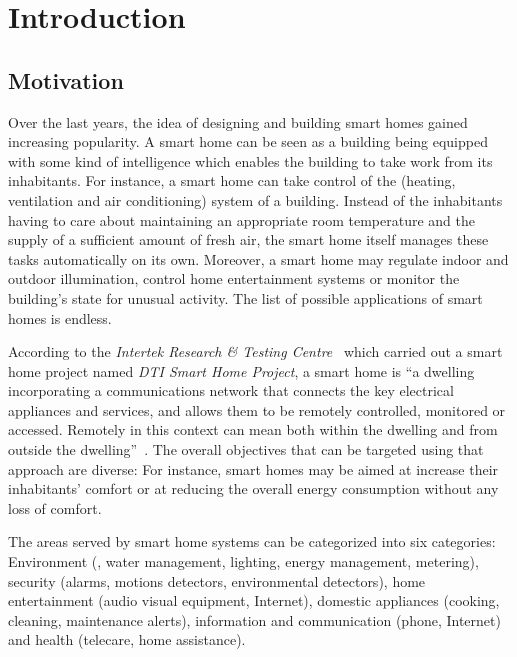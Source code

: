 \chapter{Introduction}
\label{ch:intro}

\section{Motivation}
\label{sec:motivation}

Over the last years, the idea of designing and building smart homes gained increasing popularity. A smart home can be seen as a building being equipped with some kind of intelligence which enables the building to take work from its inhabitants. For instance, a smart home can take control of the  (heating, ventilation and air conditioning) system of a building. Instead of the inhabitants having to care about maintaining an appropriate room temperature and the supply of a sufficient amount of fresh air, the smart home itself manages these tasks automatically on its own. Moreover, a smart home may regulate indoor and outdoor illumination, control home entertainment systems or monitor the building's state for unusual activity. The list of possible applications of smart homes is endless.

According to the \emph{Intertek Research \& Testing Centre}~\cite{intertek} which carried out a smart home project named \emph{DTI Smart Home Project}, a smart home is ``a dwelling incorporating a communications network that connects the key electrical appliances and services, and allows them to be remotely controlled, monitored or accessed. Remotely in this context can mean both within the dwelling and from outside the dwelling''~\cite{SmartHomeDefinition,SmartHomeResearch}. The overall objectives that can be targeted using that approach are diverse: For instance, smart homes may be aimed at increase their inhabitants' comfort or at reducing the overall energy consumption without any loss of comfort.

The areas served by smart home systems can be categorized into six categories: Environment (, water management, lighting, energy management, metering), security (alarms, motions detectors, environmental detectors), home entertainment (audio visual equipment, Internet), domestic appliances (cooking, cleaning, maintenance alerts), information and communication (phone, Internet) and health (telecare, home assistance). %

